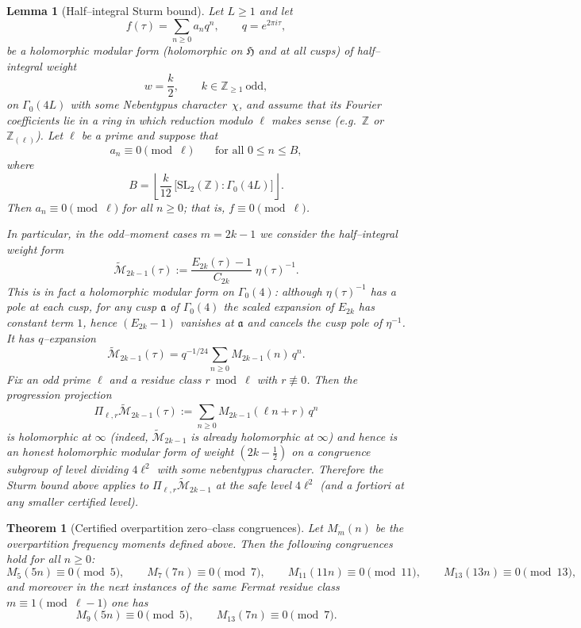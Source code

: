 \documentclass[10pt,a4paper]{amsart}
\newtheorem{theorem}{Theorem}
\newtheorem{lemma}{Lemma}
\begin{document}
\begin{lemma}[Half--integral Sturm bound]\label{lem:sturm-half}
Let $L\ge1$ and let
\[
f(\tau)=\sum_{n\ge0} a_n q^n,\qquad q=e^{2\pi i\tau},
\]
be a holomorphic modular form (holomorphic on $\mathfrak{H}$ and at all cusps)
of half--integral weight
\[
w=\frac{k}{2},\qquad k\in\mathbb{Z}_{\ge1}\ \text{odd},
\]
on $\Gamma_0(4L)$ with some Nebentypus character~$\chi$, and assume that its
Fourier coefficients lie in a ring in which reduction modulo $\ell$ makes sense
(e.g.\ $\mathbb{Z}$ or $\mathbb{Z}_{(\ell)}$).  Let $\ell$ be a prime and suppose that
\[
a_n \equiv 0 \pmod{\ell}\qquad\text{for all }0\le n\le B,
\]
where
\[
B
=\left\lfloor \frac{k}{12}\,
   \bigl[\mathrm{SL}_2(\mathbb{Z}):\Gamma_0(4L)\bigr]\right\rfloor.
\]
Then $a_n\equiv0\pmod{\ell}$ for all $n\ge0$; that is, $f\equiv0\pmod{\ell}$.

\medskip
In particular, in the odd--moment cases $m=2k-1$ we consider the half--integral
weight form
\[
\widetilde{\mathcal M}_{2k-1}(\tau)
:=\frac{E_{2k}(\tau)-1}{C_{2k}}\;\eta(\tau)^{-1}.
\]
This is in fact a \emph{holomorphic} modular form on $\Gamma_0(4)$: although
$\eta(\tau)^{-1}$ has a pole at each cusp, for any cusp $\mathfrak a$ of
$\Gamma_0(4)$ the scaled expansion of $E_{2k}$ has constant term $1$, hence
$(E_{2k}-1)$ vanishes at $\mathfrak a$ and cancels the cusp pole of $\eta^{-1}$.
It has $q$--expansion
\[
\widetilde{\mathcal M}_{2k-1}(\tau)=q^{-1/24}\sum_{n\ge0} M_{2k-1}(n)\,q^n.
\]
Fix an odd prime $\ell$ and a residue class $r\bmod \ell$ with $r\not\equiv 0$.
Then the progression projection
\[
\Pi_{\ell,r}\widetilde{\mathcal M}_{2k-1}(\tau)
:=\sum_{n\ge0} M_{2k-1}(\ell n+r)\,q^n
\]
is holomorphic at $\infty$ (indeed, $\widetilde{\mathcal M}_{2k-1}$ is already
holomorphic at $\infty$) and hence is an honest holomorphic modular form of
weight $(2k-\tfrac12)$ on a congruence subgroup of level dividing $4\ell^2$ with
some nebentypus character.  Therefore the Sturm bound above applies to
$\Pi_{\ell,r}\widetilde{\mathcal M}_{2k-1}$ at the safe level $4\ell^2$ (and a
fortiori at any smaller certified level).
\end{lemma}

\begin{theorem}[Certified overpartition zero--class congruences]\label{thm:overpart-zero}
Let $M^{\overline{\ }}_m(n)$ be the overpartition frequency moments defined
above.  Then the following congruences hold for all $n\ge0$:
\[
M^{\overline{\ }}_{5}(5n)\equiv 0 \pmod{5},\qquad
M^{\overline{\ }}_{7}(7n)\equiv 0 \pmod{7},\qquad
M^{\overline{\ }}_{11}(11n)\equiv 0 \pmod{11},\qquad
M^{\overline{\ }}_{13}(13n)\equiv 0 \pmod{13},
\]
and moreover in the next instances of the same Fermat residue class
$m\equiv 1\pmod{\ell-1}$ one has
\[
M^{\overline{\ }}_{9}(5n)\equiv 0 \pmod{5},\qquad
M^{\overline{\ }}_{13}(7n)\equiv 0 \pmod{7}.
\]
\end{theorem}
\end{document}
